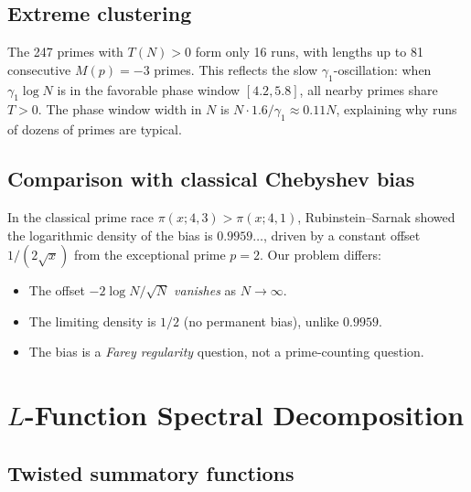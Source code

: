 \documentclass[11pt]{article}
\theoremstyle{definition}
\begin{document}

\subsection{Extreme clustering}

The 247 primes with $T(N) > 0$ form only 16 runs, with lengths up to
81 consecutive $M(p) = -3$ primes.  This reflects the slow
$\gamma_1$-oscillation: when $\gamma_1 \log N$ is in the favorable
phase window $[4.2, 5.8]$, all nearby primes share $T > 0$.  The
phase window width in $N$ is $N \cdot 1.6/\gamma_1 \approx 0.11N$,
explaining why runs of dozens of primes are typical.

\subsection{Comparison with classical Chebyshev bias}

In the classical prime race $\pi(x;4,3) > \pi(x;4,1)$,
Rubinstein--Sarnak showed the logarithmic density of the bias is
$0.9959\ldots$, driven by a constant offset $1/(2\sqrt{x})$ from
the exceptional prime $p = 2$.  Our problem differs:
\begin{itemize}
  \item The offset $-2\log N/\sqrt{N}$ \emph{vanishes} as $N \to \infty$.
  \item The limiting density is $1/2$ (no permanent bias), unlike
    $0.9959$.
  \item The bias is a \emph{Farey regularity} question, not a
    prime-counting question.
\end{itemize}



\section{$L$-Function Spectral Decomposition}\label{sec:l-function}

\subsection{Twisted summatory functions}
\end{document}
